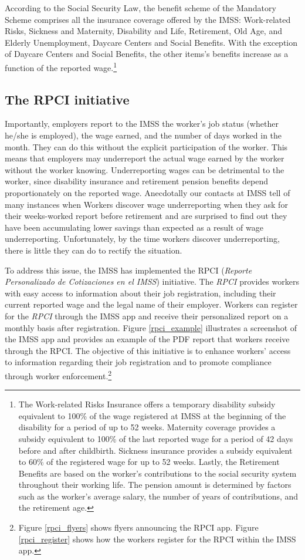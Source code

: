 \documentclass[oneside,11pt]{article}
\begin{document}
According to the Social Security Law, the benefit scheme of the Mandatory Scheme comprises all the insurance coverage offered by the IMSS: Work-related Risks, Sickness and Maternity, Disability and Life, Retirement, Old Age, and Elderly Unemployment, Daycare Centers and Social Benefits.
With the exception of Daycare Centers and Social Benefits, the other items's benefits increase as a function of the reported wage.\footnote{The Work-related Risks Insurance offers a temporary disability subsidy equivalent to 100\% of the wage registered at IMSS at the beginning of the disability for a period of up to 52 weeks. Maternity coverage provides a subsidy equivalent to 100\% of the last reported wage for a period of 42 days before and after childbirth. Sickness insurance provides a subsidy equivalent to 60\% of the registered wage for up to 52 weeks. Lastly, the Retirement Benefits are based on the worker's contributions to the social security system throughout their working life. The pension amount is determined by factors such as the worker's average salary, the number of years of contributions, and the retirement age.}  


\subsection{The RPCI initiative}

Importantly, employers report to the IMSS the worker's job status (whether he/she is employed), the wage earned, and the number of days worked in the month. They can do this without the explicit participation of the worker. This means that employers may underreport the actual wage earned by the worker without the worker knowing. Underreporting wages can be detrimental to the worker, since disability insurance and retirement pension benefits depend proportionately on the reported wage. Anecdotally our contacts at IMSS tell of many instances when Workers discover wage underreporting when they ask for their weeks-worked report before retirement and are surprised to find out they have been accumulating lower savings than expected as a result of wage underreporting.  Unfortunately, by the time workers discover underreporting, there is little they can do to rectify the situation. 

To address this issue, the IMSS has implemented the RPCI (\textit{Reporte Personalizado de Cotizaciones en el IMSS}) initiative. The \textit{RPCI} provides workers with easy access to information about their job registration, including their current reported wage and the legal name of their employer. Workers can register for the \textit{RPCI} through the IMSS app and receive their personalized report on a monthly basis after registration. Figure \ref{rpci_example} illustrates a screenshot of the IMSS app and provides an example of the PDF report that workers receive through the RPCI. The objective of this initiative is to enhance workers' access to information regarding their job registration and to promote compliance through worker enforcement.\footnote{Figure \ref{rpci_flyers} shows flyers announcing the RPCI app. Figure \ref{rpci_register} shows how the workers register for the RPCI within the IMSS app.}
\end{document}
